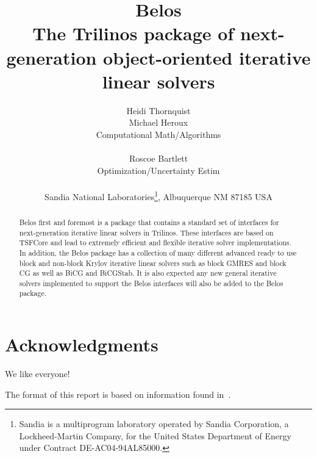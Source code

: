 \documentclass[pdf,ps2pdf,11pt]{SANDreport}
\title{
{\Huge\bf Belos}\\[1.5ex] The Trilinos package of next-generation
object-oriented iterative linear solvers }
\author{
Heidi Thornquist \\
Michael Heroux \\
Computational Math/Algorithms \\ \\
Roscoe Bartlett \\
Optimization/Uncertainty Estim \\ \\
Sandia National Laboratories\footnote{
Sandia is a multiprogram laboratory operated by Sandia Corporation, a
Lockheed-Martin Company, for the United States Department of Energy
under Contract DE-AC04-94AL85000.}, Albuquerque NM 87185 USA
}
\date{}
\begin{document}
\maketitle

%

%
\begin{abstract}
%
Belos first and foremost is a package that contains a standard set of
interfaces for next-generation iterative linear solvers in Trilinos.
These interfaces are based on TSFCore and lead to extremely efficient
and flexible iterative solver implementations.  In addition, the Belos
package has a collection of many different advanced ready to use block
and non-block Krylov iterative linear solvers such as block GMRES and
block CG as well as BiCG and BiCGStab.  It is also expected any new
general iterative solvers implemented to support the Belos interfaces
will also be added to the Belos package.
%
\end{abstract}
%

%
\clearpage
\section*{Acknowledgments}
We like everyone!

The format of this report is based on information found
in~\cite{Sand98-0730}.

%
\clearpage
\tableofcontents
\listoffigures

\end{document}

